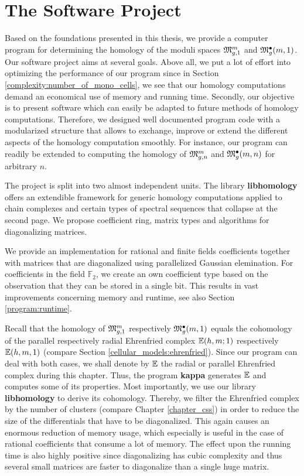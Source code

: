 \chapter{The Software Project}
\label{program}

Based on the foundations presented in this thesis, 
we provide a computer program for determining the homology of the moduli spaces $\Modspc[1]$ and $\ModspcRad[1]$.
Our software project aims at several goals.
Above all, we put a lot of effort into optimizing the performance of our program
since in Section \ref{complexity:number_of_mono_cells}, we see that our homology computations demand 
an economical use of memory and running time.  
Secondly, our objective is to present software which can easily be adapted to future methods of homology computations. 
Therefore, we designed well documented program code with a modularized structure 
that allows to exchange, improve or extend the different aspects of the homology computation smoothly.
For instance, our program can readily be extended to computing the homology of $\Modspc$ and $\ModspcRad$ for arbitrary $n$.

The project is split into two almost independent units.
The library {\bf libhomology} offers an extendible framework for generic homology computations applied to chain complexes and certain types of spectral sequences that collapse at the second page.
We propose coefficient ring, matrix types and algorithms for diagonalizing matrices.

We provide an implementation for rational and finite fields coefficients together with matrices that are diagonalized using parallelized Gaussian elemination.
For coefficients in the field $\mathbb F_2$, we create an own coefficient type based on the observation that they can be stored in a single bit.
This results in vast improvements concerning memory and runtime, see also Section \ref{program:runtime}.

Recall that the homology of $\Modspc[1]$ respectively $\ModspcRad[1]$ equals the cohomology of the parallel respectively radial Ehrenfried complex $\E(h, m;1)$ respectively $\E(h, m, 1)$
(compare Section \ref{cellular_models:ehrenfried}).
Since our program can deal with both cases, we shall denote by $\Ehrprog$ the radial or parallel Ehrenfried complex during this chapter.
Thus, the program {\bf kappa} generates $\Ehrprog$ and computes some of its properties.
Most importantly, we use our library {\bf libhomology} to derive its cohomology.
Thereby, we filter the Ehrenfried complex by the number of clusters (compare Chapter \ref{chapter_css})
in order to reduce the size of the differentials that have to be diagonalized.
This again causes an enormous reduction of memory usage, 
which especially is useful in the case of rational coefficients that consume a lot of memory. 
The effect upon the running time is also highly positive 
since diagonalizing has cubic complexity and thus several small matrices are faster to diagonalize than a single huge matrix.

